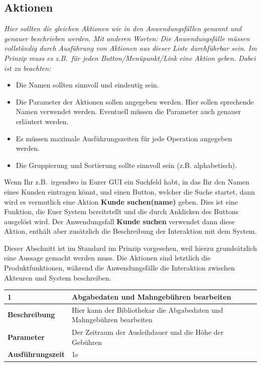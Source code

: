 \documentclass[fontsize=12pt,paper=a4,twoside]{scrartcl}
\begin{document}
\subsection{Aktionen}
  {\em Hier sollten die gleichen Aktionen wie in den Anwendungsfällen
  genannt und genauer beschrieben werden. Mit anderen Worten: Die
  Anwendungsfälle müssen vollständig durch Ausführung von Aktionen aus
  dieser Liste durchführbar sein. Im Prinzip muss es z.B.\ für jeden
  Button/Menüpunkt/Link eine Aktion geben. Dabei ist zu beachten:
  \begin{itemize}
    \item Die Namen sollten sinnvoll und eindeutig sein.

    \item Die Parameter der Aktionen sollen angegeben werden. Hier
    sollen sprechende Namen verwendet werden. Eventuell müssen die
    Parameter auch genauer erläutert werden.

    \item Es müssen maximale Ausführungszeiten für jede Operation
    angegeben werden.
    
  \item Die Gruppierung und Sortierung sollte sinnvoll sein
    (z.B. alphabetisch).
  \end{itemize}

  Wenn Ihr z.B.\ irgendwo in Eurer GUI ein Suchfeld habt, in das Ihr
  den Namen eines Kunden eintragen könnt, und einen Button, welcher die
  Suche startet, dann wird es vermutlich eine Aktion {\bf Kunde
    suchen(name)} geben. Dies ist eine Funktion, die Euer System
  bereitstellt und die durch Anklicken des Buttons ausgelöst wird. Der
  Anwendungsfall {\bf Kunde suchen} verwendet dann diese Aktion,
  enthält aber zusätzlich die Beschreibung der Interaktion mit dem
  System.
  
  Dieser Abschnitt ist im Standard im Prinzip vorgesehen, weil hierzu
  grundsätzlich eine Aussage gemacht werden muss. Die Aktionen sind
  letztlich die Produktfunktionen, während die Anwendungsfälle die
  Interaktion zwischen Akteuren und System beschreiben. }

  \begin{table}[htbp]
  \label{a1}
  \begin{tabular}{|l|p{10cm}|}
  \hline 
  \textbf{1} & \textbf{Abgabedaten und Mahngebühren bearbeiten} \\ \hline
  \textbf{Beschreibung} & Hier kann der Bibliothekar die Abgabedaten und Mahngebühren bearbeiten\\ \hline
  \textbf{Parameter} & Der Zeitraum der Ausleihdauer und die Höhe der Gebühren \\ \hline
  \textbf{Ausführungszeit} & 1s\\ \hline
  \end{tabular}
  \end{table}
  
\end{document}
